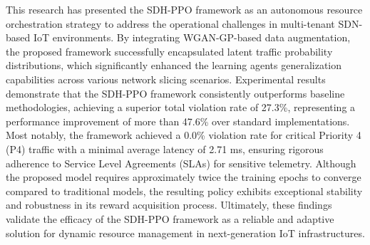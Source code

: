 \documentclass[conference]{IEEEtran}
\begin{document}
This research has presented the SDH-PPO framework as an autonomous resource orchestration strategy to address the operational challenges in multi-tenant SDN-based IoT environments. By integrating WGAN-GP-based data augmentation, the proposed framework successfully encapsulated latent traffic probability distributions, which significantly enhanced the learning agent\textquotesingle s generalization capabilities across various network slicing scenarios. Experimental results demonstrate that the SDH-PPO framework consistently outperforms baseline methodologies, achieving a superior total violation rate of 27.3\%, representing a performance improvement of more than 47.6\% over standard implementations. Most notably, the framework achieved a 0.0\% violation rate for critical Priority 4 (P4) traffic with a minimal average latency of 2.71 ms, ensuring rigorous adherence to Service Level Agreements (SLAs) for sensitive telemetry. Although the proposed model requires approximately twice the training epochs to converge compared to traditional models, the resulting policy exhibits exceptional stability and robustness in its reward acquisition process. Ultimately, these findings validate the efficacy of the SDH-PPO framework as a reliable and adaptive solution for dynamic resource management in next-generation IoT infrastructures.
\end{document}
